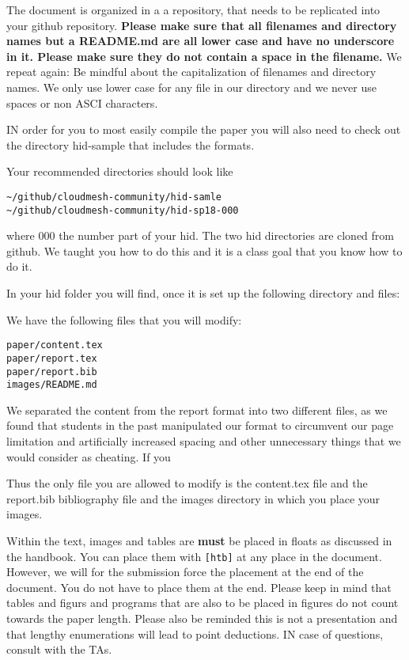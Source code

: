 The document is organized in a a repository, that needs to be
replicated into your github repository. {\bf Please make sure that all
  filenames and directory names but a README.md are all lower case and
  have no underscore in it. Please make sure they do not contain a
  space in the filename.} We repeat again: Be mindful about the
capitalization of filenames and directory names. We only use lower
case for any file in our directory and we never use spaces or non ASCI
characters. 

IN order for you to most easily compile the paper you will also need
to check out the directory hid-sample that includes the formats. 

Your recommended directories should look like

\begin{verbatim}
~/github/cloudmesh-community/hid-samle
~/github/cloudmesh-community/hid-sp18-000
\end{verbatim}

where 000 the number part of your hid. The two hid directories are
cloned from github. We taught you how to do this and it is a class
goal that you know how to do it. 

In your hid folder you will find, once it is set up the following
directory and files:


We have the following files that you will modify:

\begin{verbatim}
paper/content.tex
paper/report.tex
paper/report.bib
images/README.md
\end{verbatim}

We separated the content from the report format into two different
files, as we found that students in the past manipulated our format to
circumvent our page limitation and artificially increased spacing and
other unnecessary things that we would consider as cheating.
If you

Thus the only file you are allowed to modify is the content.tex file
and the report.bib bibliography file and the images directory in which
you place your images.

Within the text, images and tables are {\bf must} be placed in floats
as discussed in the handbook. You can place them with \verb|[htb]| at
any place in the document. However, we will for the submission force
the placement at the end of the document. You do not have to place
them at the end. Please keep in mind that tables and figurs and
programs that are also to be placed in figures do not count towards
the paper length. Please also be reminded this is not a presentation
and that lengthy enumerations will lead to point deductions. IN case
of questions, consult with the TAs.

